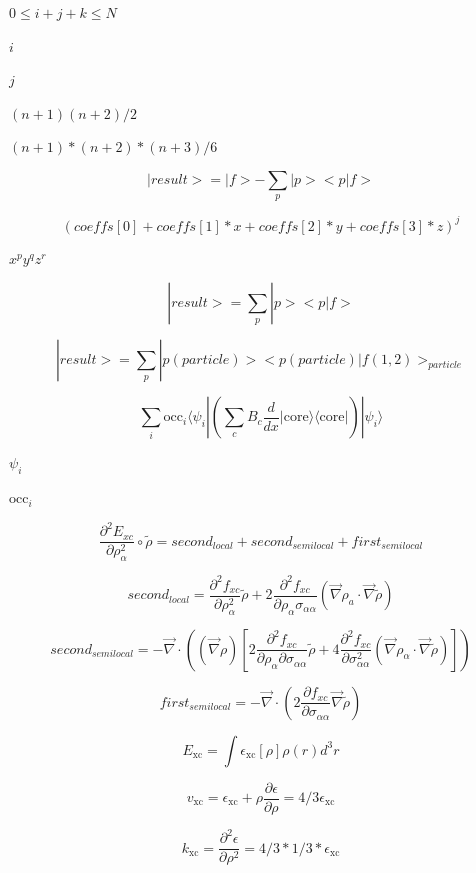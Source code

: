 \documentclass{article}
\begin{document}
$0\le i+j+k\le N$
\pagebreak

$i$
\pagebreak

$j$
\pagebreak

$(n+1)(n+2)/2$
\pagebreak

$(n+1)*(n+2)*(n+3)/6$
\pagebreak

\[
  |result> = |f> - \sum_p |p><p|f>
\]
\pagebreak

\[ (coeffs[0] + coeffs[1]*x + coeffs[2]*y + coeffs[3]*z)^j \]
\pagebreak

$x^p y^q z^r$
\pagebreak

\[
    | result > =  \sum_p | p > <p|f>
\]
\pagebreak

\[
|result> = \sum_p |p(particle)> <p(particle)|f(1,2)>_{particle}
\]
\pagebreak

\[
\sum_i \mathrm{occ}_i \langle \psi_i | \left( \sum_c B_c \frac{d}{dx} | \mathrm{core} \rangle \langle \mathrm{core} | \right) | \psi_i \rangle
\]
\pagebreak

$ \psi_i $
\pagebreak

$ \mathrm{occ}_i $
\pagebreak

\[
  \frac{\partial^2E_{xc}}{\partial \rho_\alpha^2}\circ\tilde\rho
     = second_{local} + second_{semilocal} + first_{semilocal}
\]
\pagebreak

\[
       second_{local} = \frac{\partial^2 f_{xc}}{\partial \rho_\alpha^2}\tilde \rho
       + 2\frac{\partial^2 f_{xc}}{\partial \rho_\alpha\sigma_{\alpha\alpha}}
           \left(\vec\nabla \rho_a\cdot \vec \nabla\tilde\rho\right)
\]
\pagebreak

\[
     second_{semilocal} = -\vec\nabla\cdot\left((\vec\nabla\rho)
            \left[2\frac{\partial^2 f_{xc}}{\partial\rho_\alpha\partial\sigma_{\alpha\alpha}}\tilde\rho
            + 4\frac{\partial^2 f_{xc}}{\partial\sigma_{\alpha\alpha}^2}
               \left(\vec\nabla\rho_\alpha\cdot\vec\nabla\tilde\rho\right)\right]\right)
\]
\pagebreak

\[
     first_{semilocal} =
       -\vec\nabla\cdot\left(2\frac{\partial f_{xc}}{\partial\sigma_{\alpha\alpha}}\vec\nabla\tilde\rho\right)
\]
\pagebreak

\[
   E_\mathrm{xc} = \int\epsilon_\mathrm{xc}[\rho]\rho(r) d^3r
\]
\pagebreak

\[
   v_\mathrm{xc} = \epsilon_\mathrm{xc} + \rho\frac{\partial \epsilon}{\partial \rho}
                 = 4/3\epsilon_\mathrm{xc}
\]
\pagebreak

\[
   k_\mathrm{xc} = \frac{\partial^2\epsilon}{\partial \rho^2} = 4/3*1/3 * \epsilon_\mathrm{xc}
\]
\pagebreak
\end{document}
